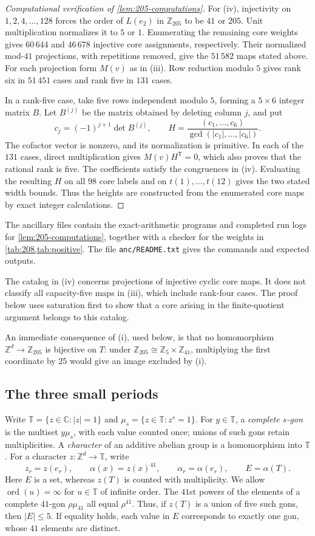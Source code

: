 \documentclass[11pt,reqno]{amsart}
\newcommand{\Z}{\mathbb Z}
\newcommand{\C}{\mathbb C}
\newcommand{\T}{\mathbb T}
\newcommand{\ord}{\operatorname{ord}}
\theoremstyle{definition}
\theoremstyle{remark}
\numberwithin{equation}{section}
\begin{document}
\begin{proof}[Computational verification of \cref{lem:205-computations}]
For (iv), injectivity on $1,2,4,\ldots,128$ forces the order of
$L(e_2)$ in $\Z_{205}$ to be $41$ or $205$. Unit multiplication
normalizes it to $5$ or $1$. Enumerating the remaining core weights
gives $60\,644$ and $46\,678$ injective core assignments, respectively.
Their normalized mod-$41$ projections, with repetitions removed, give
the $51\,582$ maps stated above. For each projection form $M(v)$ as
in (iii). Row reduction modulo $5$ gives rank six in $51\,451$ cases
and rank five in $131$ cases.

In a rank-five case, take five rows independent modulo $5$, forming
a $5\times6$ integer matrix $B$. Let $B^{(j)}$ be the matrix obtained
by deleting column $j$, and put
\[
 c_j=(-1)^{j+1}\det B^{(j)},\qquad
 H=\frac{(c_1,\ldots,c_6)}{\gcd(|c_1|,\ldots,|c_6|)}.
\]
The cofactor vector is nonzero, and its normalization is primitive.
In each of the $131$ cases, direct multiplication gives $M(v)H^{\mathsf T}=0$,
which also proves that the rational rank is five.
The coefficients satisfy the congruences in (iv). Evaluating the
resulting $H$ on all $98$ core labels and on $t(1),\ldots,t(12)$
gives the two stated width bounds. Thus the heights are constructed
from the enumerated core maps by exact integer calculations.
\end{proof}

The ancillary files contain the exact-arithmetic programs and completed
run logs for \cref{lem:205-computations}, together with a checker for
the weights in \cref{tab:208,tab:positive}. The file \texttt{anc/README.txt}
gives the commands and expected outputs.

The catalog in (iv) concerns projections of injective cyclic core maps.
It does not classify all capacity-five maps in (iii), which include
rank-four cases. The proof below uses saturation first to show that a
core arising in the finite-quotient argument belongs to this catalog.

An immediate consequence of (i), used below, is that no homomorphism
$\Z^d\to\Z_{205}$ is bijective on $T$: under
$\Z_{205}\cong\Z_5\times\Z_{41}$, multiplying the first coordinate
by $25$ would give an image excluded by (i).

\subsection{The three small periods}

Write $\T=\{z\in\C:|z|=1\}$ and
$\mu_s=\{z\in\T:z^s=1\}$. For $y\in\T$, a \emph{complete
$s$-gon} is the multiset $y\mu_s$, with each value counted once;
unions of such gons retain multiplicities. A \emph{character} of an
additive abelian group is a homomorphism into $\T$.
For a character $z:\Z^d\to\T$, write
\[
 z_r=z(e_r),\qquad \alpha(x)=z(x)^{41},\qquad
 \alpha_r=\alpha(e_r),\qquad E=\alpha(T).
\]
Here $E$ is a set, whereas $z(T)$ is counted with multiplicity.
We allow $\ord(u)=\infty$ for $u\in\T$ of infinite order.
The $41$st powers of the elements of a complete $41$-gon
$\rho\mu_{41}$ all equal $\rho^{41}$. Thus, if $z(T)$ is a union of
five such gons, then $|E|\le5$. If equality holds, each value in $E$
corresponds to exactly one gon, whose $41$ elements are distinct.
\end{document}
